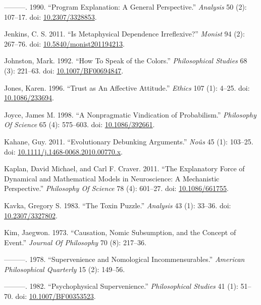 \documentclass[
  10pt,
  letterpaper,
  DIV=11,
  numbers=noendperiod,
  twoside]{scrartcl}
\newlength{\cslhangindent}
\newenvironment{CSLReferences}[2] %
 {\begin{list}{}{%
  \setlength{\itemindent}{0pt}
  \setlength{\leftmargin}{0pt}
  \setlength{\parsep}{0pt}
  \ifodd #1
   \setlength{\leftmargin}{\cslhangindent}
   \setlength{\itemindent}{-1\cslhangindent}
  \fi
  \setlength{\itemsep}{#2\baselineskip}}}
 {\end{list}}
\begin{document}
\begin{CSLReferences}{1}{0}
---------. 1990. {``Program Explanation: A General Perspective.''}
\emph{Analysis} 50 (2): 107--17. doi:
\href{https://doi.org/10.2307/3328853}{10.2307/3328853}.

Jenkins, C. S. 2011. {``Is Metaphysical Dependence Irreflexive?''}
\emph{Monist} 94 (2): 267--76. doi:
\href{https://doi.org/10.5840/monist201194213}{10.5840/monist201194213}.

Johnston, Mark. 1992. {``How To Speak of the Colors.''}
\emph{Philosophical Studies} 68 (3): 221--63. doi:
\href{https://doi.org/10.1007/BF00694847}{10.1007/BF00694847}.

Jones, Karen. 1996. {``Trust as An Affective Attitude.''} \emph{Ethics}
107 (1): 4--25. doi:
\href{https://doi.org/10.1086/233694}{10.1086/233694}.

Joyce, James M. 1998. {``A Nonpragmatic Vindication of Probabilism.''}
\emph{Philosophy Of Science} 65 (4): 575--603. doi:
\href{https://doi.org/10.1086/392661}{10.1086/392661}.

Kahane, Guy. 2011. {``Evolutionary Debunking Arguments.''} \emph{Noûs}
45 (1): 103--25. doi:
\href{https://doi.org/10.1111/j.1468-0068.2010.00770.x}{10.1111/j.1468-0068.2010.00770.x}.

Kaplan, David Michael, and Carl F. Craver. 2011. {``The Explanatory
Force of Dynamical and Mathematical Models in Neuroscience: A
Mechanistic Perspective.''} \emph{Philosophy Of Science} 78 (4):
601--27. doi: \href{https://doi.org/10.1086/661755}{10.1086/661755}.

Kavka, Gregory S. 1983. {``The Toxin Puzzle.''} \emph{Analysis} 43 (1):
33--36. doi: \href{https://doi.org/10.2307/3327802}{10.2307/3327802}.

Kim, Jaegwon. 1973. {``Causation, Nomic Subsumption, and the Concept of
Event.''} \emph{Journal Of Philosophy} 70 (8): 217--36.

---------. 1978. {``Supervenience and Nomological Incommensurables.''}
\emph{American Philosophical Quarterly} 15 (2): 149--56.

---------. 1982. {``Psychophysical Supervenience.''} \emph{Philosophical
Studies} 41 (1): 51--70. doi:
\href{https://doi.org/10.1007/BF00353523}{10.1007/BF00353523}.


\end{CSLReferences}
\end{document}
